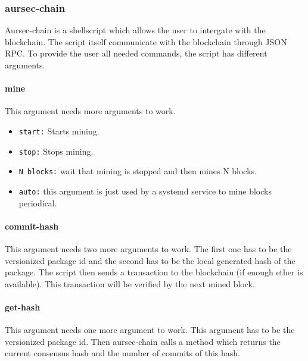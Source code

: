  \subsubsection{aursec-chain}\label{sec:aursec-chain}
Aursec-chain is a shellscript which allows the user to intergate with the blockchain. The script itself communicate with the blockchain through JSON RPC. To provide the user all needed commands, the script has different arguments.

\paragraph*{mine}
This argument needs more arguments to work.
\begin{itemize}
	\item \texttt{start:} Starts mining.
	\item \texttt{stop:} Stops mining.
	\item \texttt{N blocks:} wait that mining is stopped and then mines N blocks.
	\item \texttt{auto:} this argument is just used by a systemd service to mine blocks periodical.
\end{itemize}

\paragraph*{commit-hash}
This argument needs two more arguments to work. The first one has to be the versionized package id and the second has to be the local generated hash of the package. The script then sends a transaction to the blockchain (if enough ether is available). This transaction will be verified by the next mined block.

\paragraph*{get-hash}
This argument needs one more argument to work. This argument has to be the versionized package id. Then aursec-chain calls a method which returns the current consensus hash and the number of commits of this hash. 
